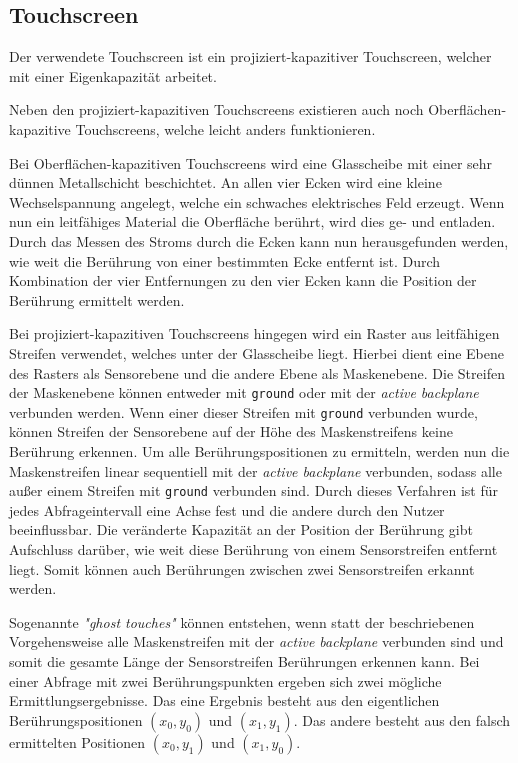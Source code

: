 \subsection{Touchscreen}

Der verwendete Touchscreen ist ein projiziert-kapazitiver Touchscreen, welcher mit einer Eigenkapazität arbeitet. \cite[\itshape4.4~Touch~panel]{ts-userManual}

Neben den projiziert-kapazitiven Touchscreens existieren auch noch Oberflächen-kapazitive Touchscreens, welche leicht anders funktionieren.

Bei Oberflächen-kapazitiven Touchscreens wird eine Glasscheibe mit einer sehr dünnen Metallschicht beschichtet.
An allen vier Ecken wird eine kleine Wechselspannung angelegt, welche ein schwaches elektrisches Feld erzeugt.
Wenn nun ein leitfähiges Material die Oberfläche berührt, wird dies ge- und entladen.
Durch das Messen des Stroms durch die Ecken kann nun herausgefunden werden, wie weit die Berührung von einer bestimmten Ecke entfernt ist.
Durch Kombination der vier Entfernungen zu den vier Ecken kann die Position der Berührung ermittelt werden.
\cite[\itshape8~Findings~and~Discussion]{ts-holzinger}

Bei projiziert-kapazitiven Touchscreens hingegen wird ein Raster aus leitfähigen Streifen verwendet, welches unter der Glasscheibe liegt.
Hierbei dient eine Ebene des Rasters als Sensorebene und die andere Ebene als Maskenebene.
Die Streifen der Maskenebene können entweder mit \texttt{ground} oder mit der \textit{active backplane} verbunden werden.
Wenn einer dieser Streifen mit \texttt{ground} verbunden wurde, können Streifen der Sensorebene auf der Höhe des Maskenstreifens keine Berührung erkennen.
Um alle Berührungspositionen zu ermitteln, werden nun die Maskenstreifen linear sequentiell mit der \textit{active backplane} verbunden, sodass alle außer einem Streifen mit \texttt{ground} verbunden sind.
Durch dieses Verfahren ist für jedes Abfrageintervall eine Achse fest und die andere durch den Nutzer beeinflussbar.
Die veränderte Kapazität an der Position der Berührung gibt Aufschluss darüber, wie weit diese Berührung von einem Sensorstreifen entfernt liegt.
Somit können auch Berührungen zwischen zwei Sensorstreifen erkannt werden.
\cite{ts-self_capacitive_multitouch}

Sogenannte \textit{"ghost touches"} können entstehen, wenn statt der beschriebenen Vorgehensweise alle Maskenstreifen mit der \textit{active backplane} verbunden sind und somit die gesamte Länge der Sensorstreifen Berührungen erkennen kann.
Bei einer Abfrage mit zwei Berührungspunkten ergeben sich zwei mögliche Ermittlungsergebnisse.
Das eine Ergebnis besteht aus den eigentlichen Berührungspositionen $(x_0,y_0)$ und $(x_1,y_1)$.
Das andere besteht aus den falsch ermittelten Positionen $(x_0,y_1)$ und $(x_1,y_0)$.

